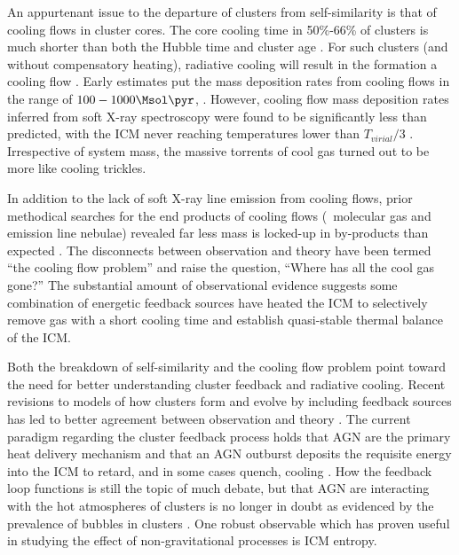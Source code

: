 An appurtenant issue to the departure of clusters from self-similarity
is that of cooling flows in cluster cores. The core cooling time in
50\%-66\% of clusters is much shorter than both the Hubble time and
cluster age \citep{1984ApJ...285....1S, 1992MNRAS.258..177E, white97,
  1998MNRAS.298..416P, 2005MNRAS.359.1481B}. For such clusters (and
without compensatory heating), radiative cooling will result in the
formation a cooling flow \citep[see][for a
  review]{fabiancfreview}. Early estimates put the mass deposition
rates from cooling flows in the range of $100-1000 \Msol \pyr$,
\citep[\eg][]{1984ApJ...276...38J}. However, cooling flow mass
deposition rates inferred from soft X-ray spectroscopy were found to
be significantly less than predicted, with the ICM never reaching
temperatures lower than $T_{virial}/3$ \citep{tamura01, peterson01,
  peterson03, 2004A&A...413..415K}. Irrespective of system mass, the
massive torrents of cool gas turned out to be more like cooling
trickles.

In addition to the lack of soft X-ray line emission from cooling
flows, prior methodical searches for the end products of cooling flows
(\ie\ molecular gas and emission line nebulae) revealed far less mass
is locked-up in by-products than expected \citep{heckman89,
  mcnamara90, odea94, voit95}. The disconnects between observation and
theory have been termed ``the cooling flow problem'' and raise the
question, ``Where has all the cool gas gone?'' The substantial amount
of observational evidence suggests some combination of energetic
feedback sources have heated the ICM to selectively remove gas with a
short cooling time and establish quasi-stable thermal balance of the
ICM.

Both the breakdown of self-similarity and the cooling flow problem
point toward the need for better understanding cluster feedback and
radiative cooling. Recent revisions to models of how clusters form and
evolve by including feedback sources has led to better agreement
between observation and theory \citep{bower06, croton06, saro06}. The
current paradigm regarding the cluster feedback process holds that AGN
are the primary heat delivery mechanism and that an AGN outburst
deposits the requisite energy into the ICM to retard, and in some
cases quench, cooling \citep[see][for a review]{mcnamrev}. How the
feedback loop functions is still the topic of much debate, but that
AGN are interacting with the hot atmospheres of clusters is no longer
in doubt as evidenced by the prevalence of bubbles in clusters
\citep{birzan04}. One robust observable which has proven useful in
studying the effect of non-gravitational processes is ICM entropy.


